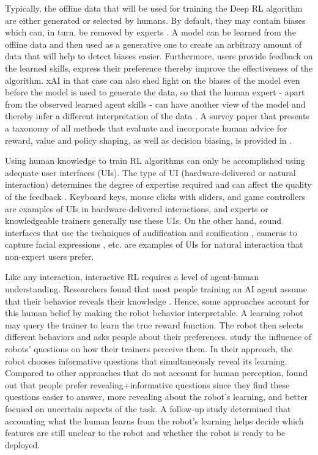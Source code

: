 \documentclass[twoside,11pt]{article}
\begin{document}
Typically, the offline data that will be used for training the Deep RL algorithm are either generated or selected by humans. By default, they may contain biases which can, in turn, be removed by experts \citep{Wang:2022:SkillPreferences}. A model can be learned from the offline data and then used as a generative one to create an arbitrary amount of data that will help to detect biases easier. Furthermore, users provide feedback on the learned skills, express their preference thereby improve the effectiveness of the algorithm. xAI in that case can also shed light on the biases of the model even before the model is used to generate the data, so that the human expert - apart from the observed learned agent skills - can have another view of the model and thereby infer a different interpretation of the data \citep{Ribeiro:2016:WhyShouldITrustYou,Mehrabi:2021:SurveyBiasFairness}. A survey paper that presents a taxonomy of all methods that evaluate and incorporate human advice for reward, value and policy shaping, as well as decision biasing, is provided in \cite{Najar:2021:RLWithHumanAdvice}.

Using human knowledge to train RL algorithms can only be accomplished using adequate user interfaces (UIs). The type of UI (hardware-delivered or natural interaction) determines the degree of expertise required and can affect the quality of the feedback \citep{lin:20}. Keyboard keys, mouse clicks with sliders, and game controllers are examples of UIs in hardware-delivered interactions, and experts or knowledgeable trainers generally use these UIs. On the other hand, sound interfaces that use the techniques of audification and sonification \citep{Hermann:2011:Sonification, Saranti:2009:QuantumHarmonicOscSonification,kartoun:10,Scurto:2021:DesigningDeepRLHumanParameterExploration}, cameras to capture facial expressions \citep{arakawa:18}, etc. are examples of UIs for natural interaction that non-expert users prefer. 

Like any interaction, interactive RL requires a level of agent-human understanding. Researchers found that most people training an AI agent assume that their behavior reveals their knowledge \citep{habibian:21}. Hence, some approaches account for this human belief by making the robot behavior interpretable. A learning robot may query the trainer to learn the true reward function. The robot then selects different behaviors and asks people about their preferences. \cite{habibian:21} study the influence of robots' questions on how their trainers perceive them. In their approach, the robot chooses informative questions that simultaneously reveal its learning. Compared to other approaches that do not account for human perception, \cite{habibian:21} found out that people prefer revealing+informative questions since they find these questions easier to answer, more revealing about the robot's learning, and better focused on uncertain aspects of the task. A follow-up study determined that accounting what the human learns from the robot's learning helps decide which features are still unclear to the robot and whether the robot is ready to be deployed. 
\end{document}

